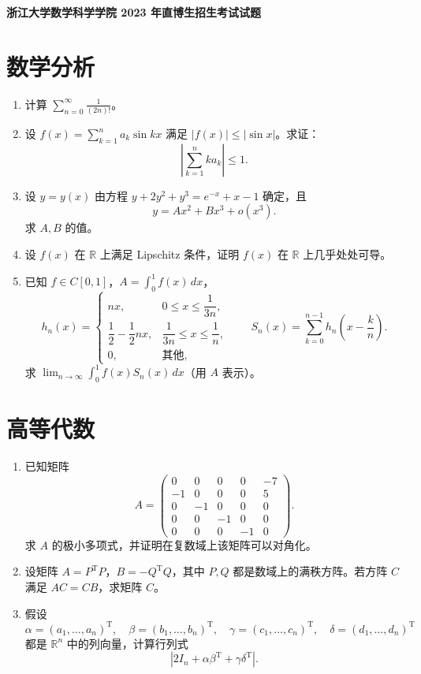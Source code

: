 \documentclass[UTF8,11pt,fontset=none]{ctexart}
\begin{document}
\begin{center}
  {\Large\bfseries 浙江大学数学科学学院 2023 年直博生招生考试试题}
\end{center}
\vspace{1em}

\section*{数学分析}
\begin{enumerate}
\item 计算 $\displaystyle\sum_{n=0}^{\infty}\frac{1}{(2n)!}$。
\item 设 $f(x)=\displaystyle\sum_{k=1}^{n}a_k\sin kx$ 满足 $|f(x)|\le |\sin x|$。求证：
\[
\left|\sum_{k=1}^{n}ka_k\right|\le 1.
\]
\item 设 $y=y(x)$ 由方程 $y+2y^2+y^3=e^{-x}+x-1$ 确定，且
\[
y=Ax^2+Bx^3+o(x^3).
\]
求 $A,B$ 的值。
\item 设 $f(x)$ 在 $\mathbb R$ 上满足 Lipschitz 条件，证明 $f(x)$ 在 $\mathbb R$ 上几乎处处可导。
\item 已知 $f\in C[0,1]$，$A=\displaystyle\int_0^1f(x)\,dx$，
\[
h_n(x)=
\begin{cases}
nx,&0\le x\le\dfrac1{3n},\\[.35em]
\dfrac12-\dfrac12nx,&\dfrac1{3n}\le x\le\dfrac1n,\\[.35em]
0,&\text{其他},
\end{cases}
\qquad
S_n(x)=\sum_{k=0}^{n-1}h_n\!\left(x-\frac{k}{n}\right).
\]
求 $\displaystyle\lim_{n\to\infty}\int_0^1 f(x)S_n(x)\,dx$（用 $A$ 表示）。
\end{enumerate}

\clearpage
\section*{高等代数}
\begin{enumerate}
\item 已知矩阵
\[
A=\begin{pmatrix}
0&0&0&0&-7\\
-1&0&0&0&5\\
0&-1&0&0&0\\
0&0&-1&0&0\\
0&0&0&-1&0
\end{pmatrix}.
\]
求 $A$ 的极小多项式，并证明在复数域上该矩阵可以对角化。
\item 设矩阵 $A=P^{\mathrm T}P$，$B=-Q^{\mathrm T}Q$，其中 $P,Q$ 都是数域上的满秩方阵。若方阵 $C$ 满足 $AC=CB$，求矩阵 $C$。
\item 假设
\[
\alpha=(a_1,\ldots,a_n)^{\mathrm T},\quad
\beta=(b_1,\ldots,b_n)^{\mathrm T},\quad
\gamma=(c_1,\ldots,c_n)^{\mathrm T},\quad
\delta=(d_1,\ldots,d_n)^{\mathrm T}
\]
都是 $\mathbb R^n$ 中的列向量，计算行列式
\[
\left|2I_n+\alpha\beta^{\mathrm T}+\gamma\delta^{\mathrm T}\right|.
\]
\end{enumerate}
\end{document}

